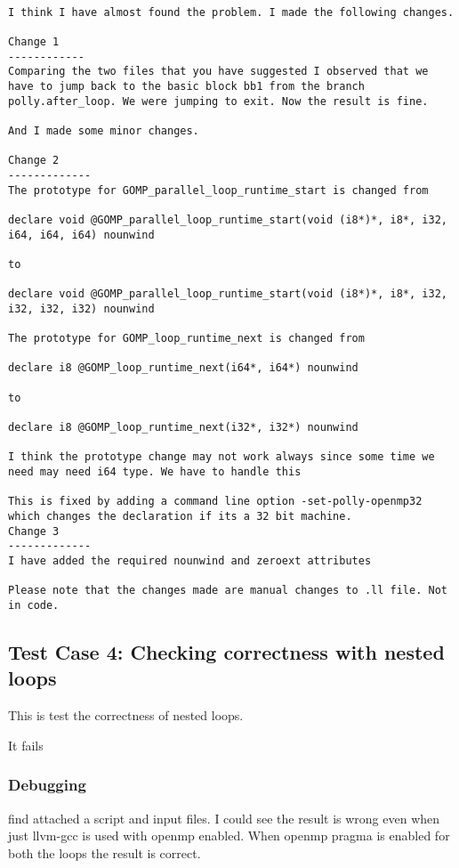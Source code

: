 \documentclass[a4paper,10pt]{article}
\begin{document}
\begin{verbatim}

I think I have almost found the problem. I made the following changes.

Change 1
------------
Comparing the two files that you have suggested I observed that we have to jump back to the basic block bb1 from the branch polly.after_loop. We were jumping to exit. Now the result is fine.

And I made some minor changes.

Change 2
-------------
The prototype for GOMP_parallel_loop_runtime_start is changed from

declare void @GOMP_parallel_loop_runtime_start(void (i8*)*, i8*, i32, i64, i64, i64) nounwind

to

declare void @GOMP_parallel_loop_runtime_start(void (i8*)*, i8*, i32, i32, i32, i32) nounwind

The prototype for GOMP_loop_runtime_next is changed from

declare i8 @GOMP_loop_runtime_next(i64*, i64*) nounwind

to

declare i8 @GOMP_loop_runtime_next(i32*, i32*) nounwind

I think the prototype change may not work always since some time we need may need i64 type. We have to handle this

This is fixed by adding a command line option -set-polly-openmp32 which changes the declaration if its a 32 bit machine.
Change 3
-------------
I have added the required nounwind and zeroext attributes

Please note that the changes made are manual changes to .ll file. Not in code.
\end{verbatim}

\subsection{Test Case 4: Checking correctness with nested loops}

This is test the correctness of nested loops.

It fails

\subsubsection{Debugging}

find attached a script and input files. I could see the result is wrong even when just llvm-gcc is used with openmp enabled. When openmp pragma is enabled for both the loops the result is correct.
\end{document}

